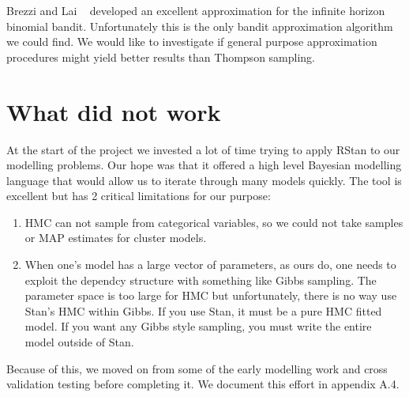 \documentclass[11pt,a4,singlespacing,titlepagenumber=on]{scrreprt}
\numberwithin{equation}{chapter} %
\theoremstyle{remark}
\begin{document}
 Brezzi and Lai ~\cite{brezzi2002optimal} developed an excellent approximation for the infinite horizon binomial bandit. Unfortunately this is the only bandit approximation algorithm we could find. We would like to investigate if general purpose approximation procedures might yield better results than Thompson sampling.

\section{What did not work}

At the start of the project we invested a lot of time trying to apply RStan to our modelling problems. Our hope was that it offered a high level Bayesian modelling language that would allow us to iterate through many models quickly. The tool is excellent but has 2 critical limitations for our purpose:
\begin{enumerate}
	\item HMC can not sample from categorical variables, so we could not take samples or MAP estimates for cluster models.
	\item When one's model has a large vector of parameters, as ours do, one needs to exploit the dependcy structure with something like Gibbs sampling. The parameter space is too large for HMC but unfortunately, there is no way use Stan's HMC within Gibbs. If you use Stan, it must be a pure HMC fitted model. If you want any Gibbs style sampling, you must write the entire model outside of Stan.
\end{enumerate}

Because of this, we moved on from some of the early modelling work and cross validation testing before completing it. We document this effort in appendix A.4.






\cleardoublepage
{}
\end{document}

